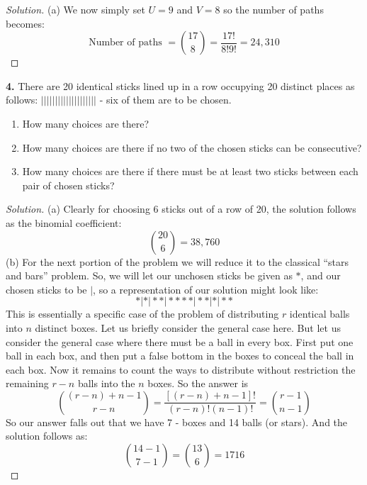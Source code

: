 \documentclass[12pt]{amsart}
\newenvironment{solution}
{\begin{proof}[Solution]}
{\end{proof}}
\begin{document}
\begin{onehalfspace}
\begin{solution}
            (a) We now simply set $U = 9$ and $V = 8$ so the number of paths becomes:
            \begin{displaymath}
                \text{Number of paths } = \binom{17}{8} = \frac{17!}{8!9!} = 24,310
            \end{displaymath}
        \end{solution}

        \textbf{4.} There are 20 identical sticks lined up in a row occupying 20 distinct places
        as follows: $\vert\vert\vert\vert\vert\vert\vert\vert\vert\vert\vert\vert\vert\vert\vert\vert\vert\vert\vert\vert$ - six of them are to be chosen.
        \begin{enumerate}[label=(\alph*)]
            \item How many choices are there?
            \item How many choices are there if no two of the chosen sticks can be consecutive?
            \item How many choices are there if there must be at least two sticks between each
                  pair of chosen sticks?
        \end{enumerate}
        \begin{solution}
            (a) Clearly for choosing 6 sticks out of a row of 20, the solution follows as the binomial coefficient:
            \begin{displaymath}
                \binom{20}{6} = 38,760
            \end{displaymath}
            (b) For the next portion of the problem we will reduce it to the classical ``stars and bars'' problem. So,
            we will let our unchosen sticks be given as $*$, and our chosen sticks to be $\vert$, so a representation
            of our solution might look like:
            \begin{displaymath}
                * \vert * \vert * * \vert * * * * \vert * * \vert * \vert * *
            \end{displaymath}
            This is essentially a specific case of the problem of distributing $r$ identical balls into $n$ distinct
            boxes. Let us briefly consider the general case here. But let us consider the general case where there must
            be a ball in every box. First put one ball in each box, and then put a false bottom in the boxes to conceal
            the ball in each box. Now it remains to count the ways to distribute without restriction the remaining
            $r - n$ balls into the $n$ boxes. So the answer is
            \begin{displaymath}
                \binom{(r - n) + n - 1}{r - n} = \frac{\left[(r - n) + n - 1\right]!}{(r - n)!(n - 1)!} = \binom{r-1}{n-1}
            \end{displaymath}
            So our answer falls out that we have 7 - boxes and 14 balls (or stars). And the solution follows as:
            \begin{displaymath}
                \binom{14 - 1}{7 - 1} = \binom{13}{6} = 1716
            \end{displaymath}


\end{solution}
\end{onehalfspace}
\end{document}
